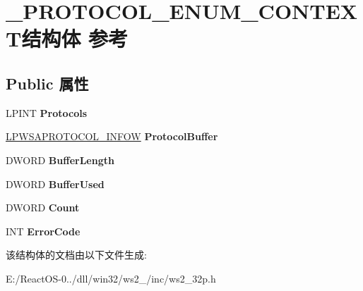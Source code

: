 \hypertarget{struct___p_r_o_t_o_c_o_l___e_n_u_m___c_o_n_t_e_x_t}{}\section{\+\_\+\+P\+R\+O\+T\+O\+C\+O\+L\+\_\+\+E\+N\+U\+M\+\_\+\+C\+O\+N\+T\+E\+X\+T结构体 参考}
\label{struct___p_r_o_t_o_c_o_l___e_n_u_m___c_o_n_t_e_x_t}
\subsection*{Public 属性}
\begin{DoxyCompactItemize}
\item 
\mbox{\label{struct___p_r_o_t_o_c_o_l___e_n_u_m___c_o_n_t_e_x_t_afb76f2d075a5baec2bee71a5b695fca5}} 
L\+P\+I\+NT {\bfseries Protocols}
\item 
\mbox{\label{struct___p_r_o_t_o_c_o_l___e_n_u_m___c_o_n_t_e_x_t_a0bea8a49c86089acfd90390f56efbd0b}} 
\hyperlink{struct___w_s_a_p_r_o_t_o_c_o_l___i_n_f_o_w}{L\+P\+W\+S\+A\+P\+R\+O\+T\+O\+C\+O\+L\+\_\+\+I\+N\+F\+OW} {\bfseries Protocol\+Buffer}
\item 
\mbox{\label{struct___p_r_o_t_o_c_o_l___e_n_u_m___c_o_n_t_e_x_t_ac28335be0e0e4c68e5fda24a3858cb3f}} 
D\+W\+O\+RD {\bfseries Buffer\+Length}
\item 
\mbox{\label{struct___p_r_o_t_o_c_o_l___e_n_u_m___c_o_n_t_e_x_t_abe65d57ae4459b6775dd79c47b7d9861}} 
D\+W\+O\+RD {\bfseries Buffer\+Used}
\item 
\mbox{\label{struct___p_r_o_t_o_c_o_l___e_n_u_m___c_o_n_t_e_x_t_a690f218291db224fb9ac136b3cfad17f}} 
D\+W\+O\+RD {\bfseries Count}
\item 
\mbox{\label{struct___p_r_o_t_o_c_o_l___e_n_u_m___c_o_n_t_e_x_t_a213a2b1b08f0f5bdeb4e4889b427ddc7}} 
I\+NT {\bfseries Error\+Code}
\end{DoxyCompactItemize}


该结构体的文档由以下文件生成\+:\begin{DoxyCompactItemize}
\item 
E\+:/\+React\+O\+S-\/0../dll/win32/ws2\+\_/inc/ws2\+\_\+32p.\+h\end{DoxyCompactItemize}
